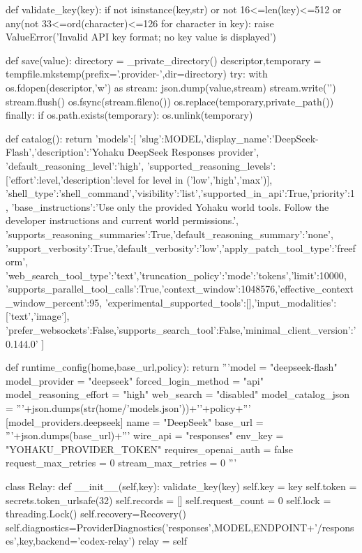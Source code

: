 def validate_key(key):
    if not isinstance(key,str) or not 16<=len(key)<=512 or any(not 33<=ord(character)<=126 for character in key):
        raise ValueError('Invalid API key format; no key value is displayed')


def save(value):
    directory = _private_directory()
    descriptor,temporary = tempfile.mkstemp(prefix='.provider-',dir=directory)
    try:
        with os.fdopen(descriptor,'w') as stream:
            json.dump(value,stream)
            stream.write('\n')
            stream.flush()
            os.fsync(stream.fileno())
        os.replace(temporary,private_path())
    finally:
        if os.path.exists(temporary):
            os.unlink(temporary)


def catalog():
    return {'models':[{
        'slug':MODEL,'display_name':'DeepSeek-Flash','description':'Yohaku DeepSeek Responses provider',
        'default_reasoning_level':'high',
        'supported_reasoning_levels':[{'effort':level,'description':level} for level in ('low','high','max')],
        'shell_type':'shell_command','visibility':'list','supported_in_api':True,'priority':1,
        'base_instructions':'Use only the provided Yohaku world tools. Follow the developer instructions and current world permissions.',
        'supports_reasoning_summaries':True,'default_reasoning_summary':'none',
        'support_verbosity':True,'default_verbosity':'low','apply_patch_tool_type':'freeform',
        'web_search_tool_type':'text','truncation_policy':{'mode':'tokens','limit':10000},
        'supports_parallel_tool_calls':True,'context_window':1048576,'effective_context_window_percent':95,
        'experimental_supported_tools':[],'input_modalities':['text','image'],
        'prefer_websockets':False,'supports_search_tool':False,'minimal_client_version':'0.144.0'
    }]}


def runtime_config(home,base_url,policy):
    return '''model = "deepseek-flash"
model_provider = "deepseek"
forced_login_method = "api"
model_reasoning_effort = "high"
web_search = "disabled"
model_catalog_json = '''+json.dumps(str(home/'models.json'))+'\n'+policy+'''
[model_providers.deepseek]
name = "DeepSeek"
base_url = '''+json.dumps(base_url)+'''
wire_api = "responses"
env_key = "YOHAKU_PROVIDER_TOKEN"
requires_openai_auth = false
request_max_retries = 0
stream_max_retries = 0
'''


class Relay:
    def __init__(self,key):
        validate_key(key)
        self.key = key
        self.token = secrets.token_urlsafe(32)
        self.records = []
        self.request_count = 0
        self.lock = threading.Lock()
        self.recovery=Recovery()
        self.diagnostics=ProviderDiagnostics('responses',MODEL,ENDPOINT+'/responses',key,backend='codex-relay')
        relay = self

